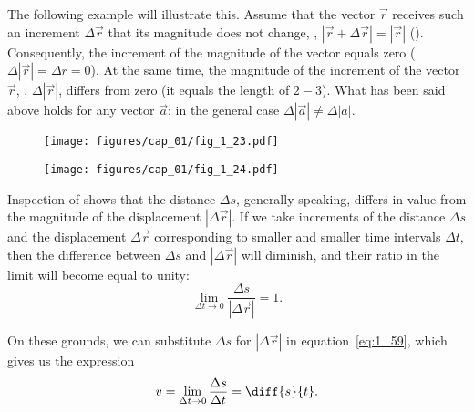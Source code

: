 \noindent
The following example will illustrate this. Assume that the vector $\vec{r}$ receives such an increment $\Delta\vec{r}$ that its magnitude does not change, \ie, $|\vec{r}+\Delta\vec{r}|=|\vec{r}|$ (). Consequently, the increment of the magnitude of the vector equals zero ($\Delta|\vec{r}| = \Delta r = 0$). At the same time, the magnitude of the increment of the vector $\vec{r}$, \ie, $\Delta|\vec{r}|$, differs from zero (it equals the length of $2-3$). What has been said above holds for any vector $\vec{a}$: in the general case $\Delta|\vec{a}|\neq\Delta|a|$.

\begin{figure}[t]
	\begin{minipage}[t]{0.5\linewidth}
		\begin{center}
			\texttt{[image: figures/cap\_01/fig\_1\_23.pdf]}
			\caption[]{}
			\label{fig:1_23}
		\end{center}
	\end{minipage}
	\hfill{ }%
	\begin{minipage}[t]{0.5\linewidth}
		\begin{center}
			\texttt{[image: figures/cap\_01/fig\_1\_24.pdf]}
			\caption[]{}
			\label{fig:1_24}
		\end{center}
	\end{minipage}
\vspace{-0.7cm}
\end{figure}

Inspection of  shows that the distance $\Delta s$, generally speaking, differs in value from the magnitude of the displacement $|\Delta\vec{r}|$. If we take increments of the distance $\Delta s$ and the displacement $\Delta\vec{r}$ corresponding to smaller and smaller time intervals $\Delta t$, then the difference between $\Delta s$ and $|\Delta\vec{r}|$ will diminish, and their ratio in the limit will become equal to unity:
\begin{equation*}
\lim_{\Delta t\to 0} \frac{\Delta s}{|\Delta\vec{r}|} = 1. 
\end{equation*}

\noindent
On these grounds, we can substitute $\Delta s$ for $|\Delta\vec{r}|$ in equation~\eqref{eq:1_59}, which gives us the expression
\begin{equation}\label{eq:1_60}
v = \lim_{\Delta t\to 0} \frac{\Delta s}{\Delta t} = \diff{s}{t}. 
\end{equation}

